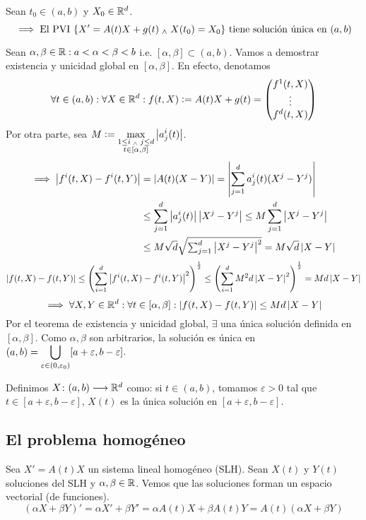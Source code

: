 \begin{teo}
	Sean $t_0 \in (a, b)$ y $X_0 \in \mathbb{R}^d$.
	\[\implies \text{El PVI }\{X' = A(t)X + g(t) \; _{\wedge} \; X(t_0) = X_0\}\text{ tiene solución única en }(a, b)\]
	\begin{dem}
		Sean $\alpha, \beta \in \mathbb{R} : a < \alpha < \beta < b$ i.e. $[\alpha, \beta] \subset (a, b)$. Vamos a demostrar existencia y unicidad global en $[\alpha, \beta]$. En efecto, denotamos
		\[\forall t \in (a,b) : \forall X \in \mathbb{R}^d : f(t, X) \vcentcolon= A(t)X + g(t)= \begin{pmatrix}
				f^1(t, X) \\
				\vdots    \\
				f^d(t, X)
			\end{pmatrix}\]
		Por otra parte, sea $\displaystyle M  \vcentcolon= \max_{\substack{1\leq i \; _{\wedge} \; j \leq d \\ t\in [\alpha, \beta]}} \left|a_j^i(t)\right|$.
		\[\begin{aligned}
				\implies \left|f^i(t, X) - f^i(t, Y)\right| & = \left|A(t) (X - Y)\right| = \left|\sum_{j=1}^{d} a_j^i(t) (X^j - Y^j)\right|                            \\
				                                     & \leq \sum_{j=1}^{d} \left|a^i_j(t)\right| \left|X^j - Y^j\right| \leq M \sum_{j=1}^{d} \left|X^j - Y^j\right|    \\
				                                     & \leq M \sqrt{d} \sqrt{\textstyle \sum_{j=1}^{d} \left|X^j - Y^j\right|^2} = M \sqrt{d} \left|X - Y\right|
			\end{aligned}\]
		\[\left|f(t, X) - f(t, Y)\right| \leq \left( \sum_{i=1}^{d} \left|f^i(t, X) - f^i(t, Y)\right|^2 \right)^{\frac{1}{2}} \leq \left( \sum_{i=1}^{d} M^2 d \left|X - Y\right|^2 \right)^{\frac{1}{2}} = M d \left|X - Y\right|\]
		\[\implies \forall X, Y \in \mathbb{R}^d : \forall t \in [\alpha, \beta] : \left|f(t, X) - f(t, Y)\right| \leq M d \left|X - Y\right|\]
		Por el teorema de existencia y unicidad global, $\exists$ una única solución definida en $[\alpha, \beta]$. Como $\alpha, \beta$ son arbitrarios, la solución es única en $\displaystyle (a, b) = \bigcup_{\varepsilon \in (0, \varepsilon_0)} [a+ \varepsilon, b - \varepsilon]$.

		Definimos $X \colon (a, b) \longrightarrow \mathbb{R}^d$ como: si $t \in (a, b)$, tomamos $\varepsilon > 0$ tal que $t \in [a + \varepsilon, b - \varepsilon]$, $X(t)$ es la única solución en $[a + \varepsilon, b - \varepsilon]$.
	\end{dem}
\end{teo}
\subsection{El problema homogéneo}
Sea $X'=A(t)X$ un sistema lineal homogéneo (SLH). Sean $X(t)$ y $Y(t)$ soluciones del SLH y $\alpha, \beta \in \mathbb{R}$. Vemos que las soluciones forman un espacio vectorial (de funciones).
\[(\alpha X + \beta Y)' = \alpha X' + \beta Y' = \alpha A(t)X + \beta A(t)Y = A(t)(\alpha X + \beta Y)\]

